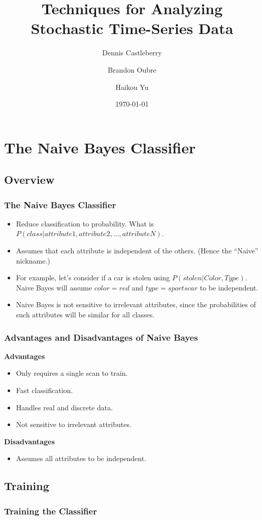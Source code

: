 \documentclass[mathserif]{beamer}
\begin{document}
	\title[Analyzing Stochastic Time-Series Data]{Techniques for Analyzing Stochastic Time-Series Data}
	\author[Castleberry \and Oubre \and Yu]{Dennis Castleberry \and Brandon Oubre \and Haikou Yu}
	\date{\today}
	\frame{\titlepage}
	
	\section{The Naive Bayes Classifier}
	\subsection{Overview}
	\begin{frame}
		\frametitle{The Naive Bayes Classifier}
		\begin{itemize}
			\item Reduce classification to probability. What is \(P(class | attribute1, attribute2, ..., attributeN)\).
			\item Assumes that each attribute is independent of the others. (Hence the ``Naive'' nickname.)
			\item For example, let's consider if a car is stolen using \(P(stolen | Color, Type)\). Naive Bayes will assume \(color=red\) and \(type=sportscar\) to be independent.
			\item Naive Bayes is not sensitive to irrelevant attributes, since the probabilities of such attributes will be similar for all classes.
		\end{itemize}
	\end{frame}
	
	\begin{frame}
		\frametitle{Advantages and Disadvantages of Naive Bayes}
		\textbf{Advantages}
		\begin{itemize}
			\item Only requires a single scan to train.
			\item Fast classification.
			\item Handles real and discrete data.
			\item Not sensitive to irrelevant attributes.
		\end{itemize}
		\textbf{Disadvantages}
		\begin{itemize}
			\item Assumes all attributes to be independent.
		\end{itemize}
	\end{frame}
	
	\subsection{Training}
	\begin{frame}
		\frametitle{Training the Classifier}
	\end{frame}
		
\end{document}
